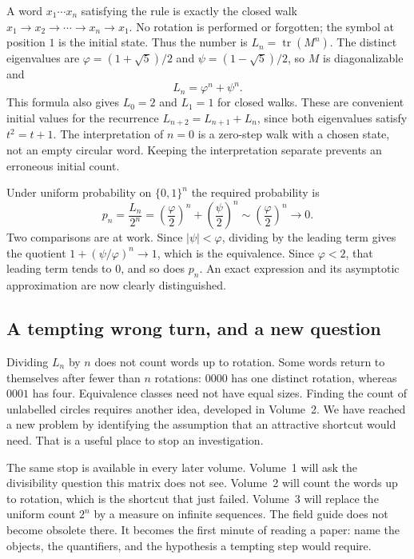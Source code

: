 A word $x_1\cdots x_n$ satisfying the rule is exactly the closed walk
$x_1\to x_2\to\cdots\to x_n\to x_1$. No rotation is performed or forgotten;
the symbol at position $1$ is the initial state. Thus the number is
$L_n=\operatorname{tr}(M^n)$. The distinct eigenvalues are
$\varphi=(1+\sqrt5)/2$ and $\psi=(1-\sqrt5)/2$, so $M$ is diagonalizable and
\[
L_n=\varphi^n+\psi^n.
\]
This formula also gives $L_0=2$ and $L_1=1$ for closed walks. These are convenient
initial values for the recurrence $L_{n+2}=L_{n+1}+L_n$, since both eigenvalues
satisfy $t^2=t+1$. The interpretation of $n=0$ is a zero-step walk with a chosen
state, not an empty circular word. Keeping the interpretation separate prevents
an erroneous initial count.

Under uniform probability on $\{0,1\}^n$ the required probability is
\[
p_n=\frac{L_n}{2^n}
=\left(\frac\varphi2\right)^n+\left(\frac\psi2\right)^n
\sim\left(\frac\varphi2\right)^n\longrightarrow0.
\]
Two comparisons are at work. Since $|\psi|<\varphi$, dividing by the leading term gives the quotient $1+(\psi/\varphi)^n\to1$, which is the equivalence. Since $\varphi<2$, that leading term tends to $0$, and so does $p_n$. An exact expression and its asymptotic approximation are now clearly distinguished.

\subsection*{A tempting wrong turn, and a new question}
Dividing $L_n$ by $n$ does not count words up to rotation. Some words return to
themselves after fewer than $n$ rotations: $0000$ has one distinct rotation,
whereas $0001$ has four. Equivalence classes need not have equal sizes. Finding
the count of unlabelled circles requires another idea, developed in Volume~2.
We have reached a new problem by identifying the assumption that an attractive
shortcut would need. That is a useful place to stop an investigation.

The same stop is available in every later volume. Volume~1 will ask the divisibility question this matrix does not see. Volume~2 will count the words up to rotation, which is the shortcut that just failed. Volume~3 will replace the uniform count $2^n$ by a measure on infinite sequences. The field guide does not become obsolete there. It becomes the first minute of reading a paper: name the objects, the quantifiers, and the hypothesis a tempting step would require.
